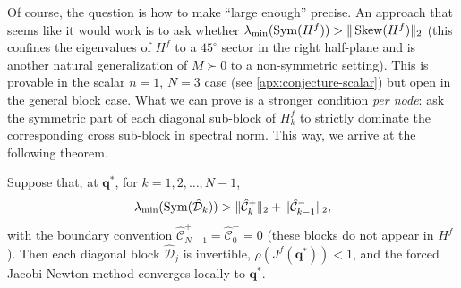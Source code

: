 Of course, the question is how to make ``large enough'' precise. An approach that seems like it would work is to ask whether $\lambda_{\min}(\operatorname{Sym}(H^f)) > \|\operatorname{Skew}(H^f)\|_2$ (this confines the eigenvalues of $H^f$ to a $45^\circ$ sector in the right half-plane and is another natural generalization of $M \succ 0$ to a non-symmetric setting). This is provable in the scalar $n = 1$, $N = 3$ case (see \cref{apx:conjecture-scalar}) but open in the general block case. What we can prove is a stronger condition \emph{per node}: ask the symmetric part of each diagonal sub-block of $H_k^f$ to strictly dominate the corresponding cross sub-block in spectral norm. This way, we arrive at the following theorem.

\begin{theorem}\label{thm:forced-local-dominance}
	Suppose that, at $\mathbf{q}^*$, for $k = 1, 2, \ldots, N-1$,
	\begin{equation}
		\lambda_{\min}(\operatorname{Sym}(\hat{\mathcal{D}}_k)) > 
        \|\hat{\mathcal{C}}^+_k\|_2 +
        \|\hat{\mathcal{C}}^-_{k-1}\|_2,
		\label{eq:local-edge-dominance}
	\end{equation}
	with the boundary convention $\hat{\mathcal{C}}^+_{N-1} = \hat{\mathcal{C}}^-_0 = 0$ (these blocks do not appear in $H^f$). Then each diagonal block $\hat{\mathcal{D}}_j$ is invertible, $\rho(J^f(\mathbf{q}^*)) < 1$, and the forced Jacobi-Newton method converges locally to $\mathbf{q}^*$.
\end{theorem}
